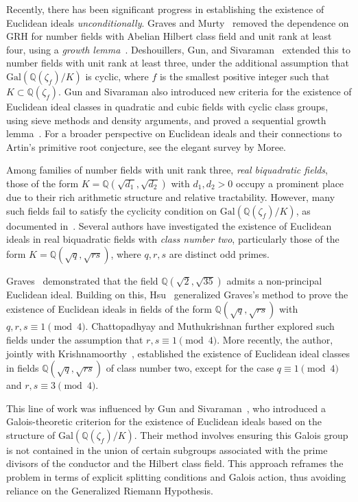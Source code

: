\documentclass[12 pt]{amsart}
\newcommand\Gal{{\mathrm {Gal}}}
\theoremstyle{definition}
\theoremstyle{remark}
\begin{document}
Recently, there has been significant progress in establishing the existence of Euclidean ideals \emph{unconditionally}. Graves and Murty~\cite{GrMu13} removed the dependence on GRH for number fields with Abelian Hilbert class field and unit rank at least four, using a \emph{growth lemma}~\cite{Gra13}. Deshouillers, Gun, and Sivaraman~\cite{DGS20} extended this to number fields with unit rank at least three, under the additional assumption that $\Gal\left(\mathbb{Q}(\zeta_f)/K\right)$ is cyclic, where $f$ is the smallest positive integer such that $K \subset \mathbb{Q}(\zeta_f)$. Gun and Sivaraman also introduced new criteria for the existence of Euclidean ideal classes in quadratic and cubic fields with cyclic class groups, using sieve methods and density arguments, and proved a sequential growth lemma~\cite[Theorem~14]{GuSi20}. For a broader perspective on Euclidean ideals and their connections to Artin's primitive root conjecture, see the elegant survey by Moree\cite{Mor12a}.

Among families of number fields with unit rank three, \emph{real biquadratic fields}, those of the form $K = \mathbb{Q}(\sqrt{d_1}, \sqrt{d_2})$ with $d_1, d_2 > 0$ occupy a prominent place due to their rich arithmetic structure and relative tractability. However, many such fields fail to satisfy the cyclicity condition on $\Gal(\mathbb{Q}(\zeta_f)/K)$, as documented in~\cite{KrPa23, KrPa25}. Several authors have investigated the existence of Euclidean ideals in real biquadratic fields with \emph{class number two}, particularly those of the form $K = \mathbb{Q}(\sqrt{q}, \sqrt{rs})$, where $q, r, s$ are distinct odd primes.

Graves~\cite{Gra11} demonstrated that the field $\mathbb{Q}(\sqrt{2}, \sqrt{35})$ admits a non-principal Euclidean ideal. Building on this, Hsu~\cite{Hsu16} generalized  Graves’s method to prove the existence of Euclidean ideals in fields of the form $\mathbb{Q}(\sqrt{q}, \sqrt{rs})$ with $q, r, s \equiv 1 \pmod{4}$. Chattopadhyay and Muthukrishnan \cite{ChMu19} further explored such fields under the assumption that $r, s \equiv 1 \pmod{4}$. More recently, the author, jointly with Krishnamoorthy~\cite{KrPa23, KrPa25}, established the existence of Euclidean ideal classes in fields $\mathbb{Q}(\sqrt{q}, \sqrt{rs})$ of class number two, except for  the case $q \equiv 1 \pmod{4}$ and $r, s \equiv 3 \pmod{4}$.

This line of work was influenced by Gun and Sivaraman~\cite{GuSi20}, who introduced a Galois-theoretic criterion for the existence of Euclidean ideals based on the structure of $\Gal(\mathbb{Q}(\zeta_f)/K)$. Their method involves ensuring this Galois group is not contained in the union of certain subgroups associated with the prime divisors of the conductor and the Hilbert class field. This approach reframes the problem in terms of explicit splitting conditions and Galois action, thus avoiding reliance on the Generalized Riemann Hypothesis.
\end{document}
